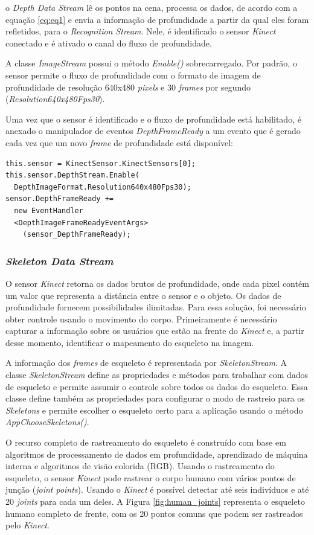 o \textit{Depth Data Stream} lê os pontos na cena, processa os dados, de acordo com a equação \ref{eq:eq1} e envia a informação de profundidade a partir da qual eles foram refletidos, para o \textit{Recognition Stream}. Nele, é identificado o sensor \textit{Kinect} conectado e é ativado o canal do fluxo de profundidade.

A classe \textit{ImageStream} possui o método \textit{Enable()} sobrecarregado. Por padrão, o sensor permite o fluxo de profundidade com o formato de imagem de profundidade de resolução 640x480 \textit{pixels} e 30 \textit{frames} por segundo (\textit{Resolution640x480Fps30}).

Uma vez que o sensor é identificado e o fluxo de profundidade está habilitado, é anexado o manipulador de eventos \textit{DepthFrameReady} a um evento que é gerado cada vez que um novo \textit{frame} de profundidade está disponível:

\begin{verbatim}
this.sensor = KinectSensor.KinectSensors[0];
this.sensor.DepthStream.Enable(
  DepthImageFormat.Resolution640x480Fps30);
sensor.DepthFrameReady +=
  new EventHandler
  <DepthImageFrameReadyEventArgs>
    (sensor_DepthFrameReady);
\end{verbatim}

\subsubsection{\textit{Skeleton Data Stream}}\label{sec:skeletonStream}
O sensor \textit{Kinect} retorna os dados brutos de profundidade, onde cada pixel contém um valor que representa a distância entre o sensor e o objeto. Os dados de profundidade fornecem possibilidades ilimitadas. Para essa solução, foi necessário obter controle usando o movimento do corpo. Primeiramente é necessário capturar a informação sobre os usuários que estão na frente do \textit{Kinect} e, a partir desse momento, identificar o mapeamento do esqueleto na imagem.

A informação dos \textit{frames} de esqueleto é representada por \textit{SkeletonStream}. A classe \textit{SkeletonStream} define as propriedades e métodos para trabalhar com dados de esqueleto e permite assumir o controle sobre todos os dados do esqueleto. Essa classe define também as propriedades para configurar o modo de rastreio para os \textit{Skeletons} e permite escolher o esqueleto certo para a aplicação usando o método \textit{AppChooseSkeletons()}. 

O recurso completo de rastreamento do esqueleto é construído com base em algoritmos de processamento de dados em profundidade, aprendizado de máquina interna e algoritmos de visão colorida (RGB). Usando o rastreamento do esqueleto, o sensor \textit{Kinect} pode rastrear o corpo humano com vários pontos de junção (\textit{joint points}). Usando o \textit{Kinect} é possível detectar até seis indivíduos e até 20 \textit{joints} para cada um deles. A Figura \ref{fig:human_joints} representa o esqueleto humano completo de frente, com os 20 pontos comuns que podem ser rastreados pelo \textit{Kinect}.

